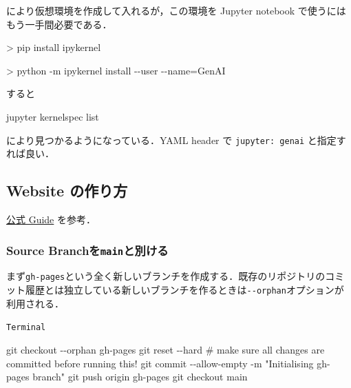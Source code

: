 \documentclass[
]{ltjsarticle}
\newenvironment{Shaded}{\begin{snugshade}}{\end{snugshade}}
\newcommand{\AttributeTok}[1]{\textcolor[rgb]{0.40,0.45,0.13}{#1}}
\newcommand{\CommentTok}[1]{\textcolor[rgb]{0.37,0.37,0.37}{#1}}
\newcommand{\ExtensionTok}[1]{\textcolor[rgb]{0.00,0.23,0.31}{#1}}
\newcommand{\FunctionTok}[1]{\textcolor[rgb]{0.28,0.35,0.67}{#1}}
\newcommand{\NormalTok}[1]{\textcolor[rgb]{0.00,0.23,0.31}{#1}}
\newcommand{\OperatorTok}[1]{\textcolor[rgb]{0.37,0.37,0.37}{#1}}
\newcommand{\StringTok}[1]{\textcolor[rgb]{0.13,0.47,0.30}{#1}}
\begin{document}
により仮想環境を作成して入れるが，この環境を Jupyter notebook
で使うにはもう一手間必要である．

\begin{Shaded}
\begin{Highlighting}[]
\OperatorTok{\textgreater{}}\NormalTok{ pip }\FunctionTok{install}\NormalTok{ ipykernel}

\OperatorTok{\textgreater{}}\NormalTok{ python }\ExtensionTok{{-}m}\NormalTok{ ipykernel install }\AttributeTok{{-}{-}user} \AttributeTok{{-}{-}name}\OperatorTok{=}\NormalTok{GenAI}
\end{Highlighting}
\end{Shaded}

すると

\begin{Shaded}
\begin{Highlighting}[]
\ExtensionTok{jupyter}\NormalTok{ kernelspec list}
\end{Highlighting}
\end{Shaded}

により見つかるようになっている．YAML header で \texttt{jupyter:\ genai}
と指定すれば良い．

\subsection{Website の作り方}\label{website-ux306eux4f5cux308aux65b9}

\href{https://quarto.org/docs/publishing/github-pages.html}{公式 Guide}
を参考．

\subsubsection{\texorpdfstring{Source
Branchを\texttt{main}と別ける}{Source Branchをmainと別ける}}\label{source-branchux3092mainux3068ux5225ux3051ux308b}

まず\texttt{gh-pages}という全く新しいブランチを作成する．既存のリポジトリのコミット履歴とは独立している新しいブランチを作るときは\texttt{-\/-orphan}オプションが利用される．

\begin{codelisting}

\caption{\texttt{Terminal}}

\begin{Shaded}
\begin{Highlighting}[]
\FunctionTok{git}\NormalTok{ checkout }\AttributeTok{{-}{-}orphan}\NormalTok{ gh{-}pages}
\FunctionTok{git}\NormalTok{ reset }\AttributeTok{{-}{-}hard} \CommentTok{\# make sure all changes are committed before running this!}
\FunctionTok{git}\NormalTok{ commit }\AttributeTok{{-}{-}allow{-}empty} \AttributeTok{{-}m} \StringTok{"Initialising gh{-}pages branch"}
\FunctionTok{git}\NormalTok{ push origin gh{-}pages}
\FunctionTok{git}\NormalTok{ checkout main}
\end{Highlighting}
\end{Shaded}

\end{codelisting}
\end{document}
